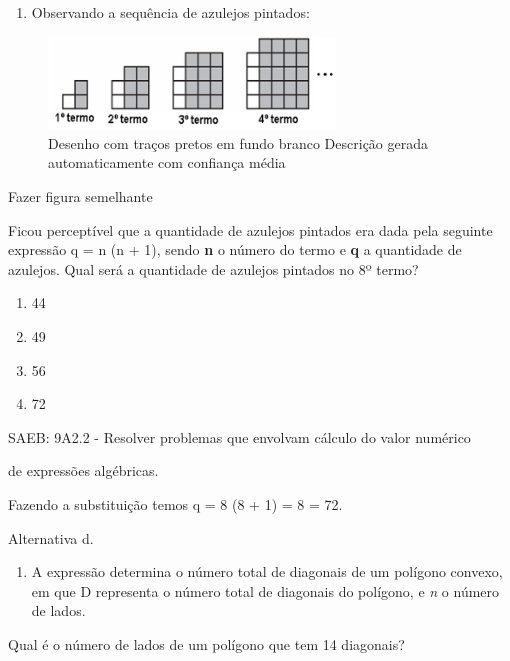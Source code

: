 \begin{escolha}
\begin{escolha}
\begin{escolha}
\begin{escolha}
{\begin{boxmedio}
\begin{boxpeq}
\begin{q°}
\begin{boxmedio}
\begin{boxpeq}
\begin{boxpeq}
\begin{boxmedio}
\begin{boxmedio}
\begin{boxmedio}
\begin{largebox}
\begin{boxmedio}
{\begin{escolha}
\begin{escolha}
\begin{escolha}
\begin{escolha}
\begin{escolha}
\begin{escolha}
{\begin{enumerate}
\num{\arabic{enumi}.}
\setcounter{enumi}{5}
\tightlist
\item
  Observando a sequência de azulejos pintados:
\end{enumerate}

\begin{figure}
\centering
\includegraphics[width=3in,height=0.96526in]{./_SAEB_9_MAT/media/image270.png}
\caption{Desenho com traços pretos em fundo branco Descrição gerada
automaticamente com confiança média}
\end{figure}

Fazer figura semelhante

Ficou perceptível que a quantidade de azulejos pintados era dada pela
seguinte expressão q = n \cdot (n + 1), sendo \textbf{n} o número do termo e
\textbf{q} a quantidade de azulejos. Qual será a quantidade de azulejos
pintados no 8º termo?

\begin{enumerate}

\item
  44
\item
  49
\item
  56
\item
  72
\end{enumerate}

SAEB: 9A2.2 - Resolver problemas que envolvam cálculo do valor numérico

de expressões algébricas.

Fazendo a substituição temos q = 8 \cdot (8 + 1) = 8  = 72.

Alternativa d.

\begin{enumerate}
\num{\arabic{enumi}.}
\setcounter{enumi}{6}
\tightlist
\item
  A expressão determina o número total de diagonais de um polígono
  convexo, em que D representa o número total de diagonais do polígono,
  e \emph{n} o número de lados.
\end{enumerate}

Qual é o número de lados de um polígono que tem 14 diagonais?

}
\end{escolha}
\end{escolha}
\end{escolha}
\end{escolha}
\end{escolha}
\end{escolha}}
\end{boxmedio}
\end{largebox}
\end{boxmedio}
\end{boxmedio}
\end{boxmedio}
\end{boxpeq}
\end{boxpeq}
\end{boxmedio}
\end{q°}
\end{boxpeq}
\end{boxmedio}}
\end{escolha}
\end{escolha}
\end{escolha}
\end{escolha}
